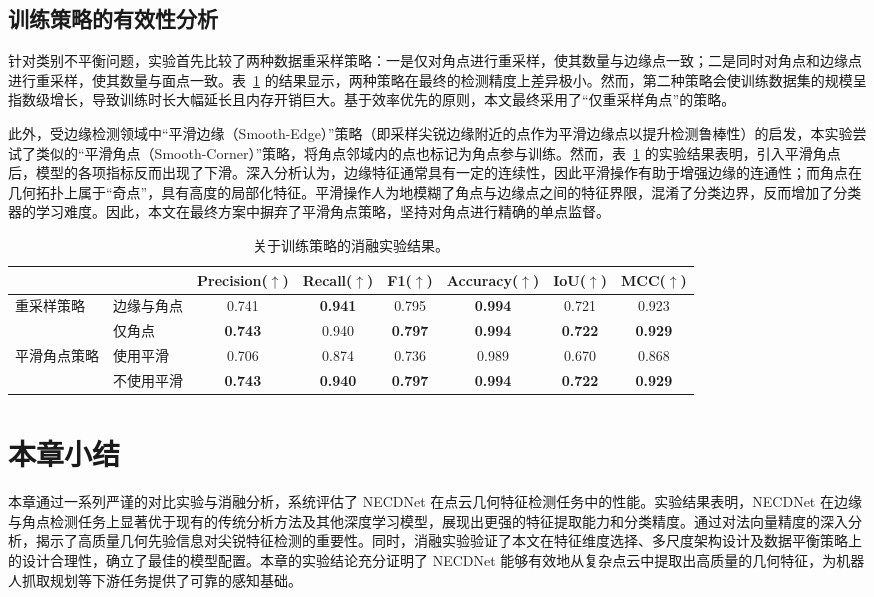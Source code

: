 \subsection{训练策略的有效性分析}

针对类别不平衡问题，实验首先比较了两种数据重采样策略：一是仅对角点进行重采样，使其数量与边缘点一致；二是同时对角点和边缘点进行重采样，使其数量与面点一致。表~\ref{tab:additional_ablation_study} 的结果显示，两种策略在最终的检测精度上差异极小。然而，第二种策略会使训练数据集的规模呈指数级增长，导致训练时长大幅延长且内存开销巨大。基于效率优先的原则，本文最终采用了“仅重采样角点”的策略。

此外，受边缘检测领域中“平滑边缘（Smooth-Edge）”策略（即采样尖锐边缘附近的点作为平滑边缘点以提升检测鲁棒性）的启发，本实验尝试了类似的“平滑角点（Smooth-Corner）”策略，将角点邻域内的点也标记为角点参与训练。然而，表~\ref{tab:additional_ablation_study} 的实验结果表明，引入平滑角点后，模型的各项指标反而出现了下滑。深入分析认为，边缘特征通常具有一定的连续性，因此平滑操作有助于增强边缘的连通性；而角点在几何拓扑上属于“奇点”，具有高度的局部化特征。平滑操作人为地模糊了角点与边缘点之间的特征界限，混淆了分类边界，反而增加了分类器的学习难度。因此，本文在最终方案中摒弃了平滑角点策略，坚持对角点进行精确的单点监督。

\begin{table}[ht]
    \centering
    \small
    \setlength{\tabcolsep}{4.5pt}
    \caption{关于训练策略的消融实验结果。}
    \label{tab:additional_ablation_study}
    \begin{tabular}{llcccccc}
            \toprule
            & & Precision($\uparrow$) & Recall($\uparrow$) & F1($\uparrow$)& Accuracy($\uparrow$)& IoU($\uparrow$)& MCC($\uparrow$)\\
            \midrule
   
            \multirow{2}{*}{重采样策略}
            & 边缘与角点 & 0.741& \textbf{0.941}& 0.795& \textbf{0.994}& 0.721& 0.923\\
            & 仅角点 & \textbf{0.743}& 0.940& \textbf{0.797}& \textbf{0.994}& \textbf{0.722}& \textbf{0.929}\\
           
            \midrule
           
            \multirow{2}{*}{平滑角点策略}
            & 使用平滑 & 0.706& 0.874& 0.736& 0.989& 0.670& 0.868\\
            & 不使用平滑 & \textbf{0.743}& \textbf{0.940}& \textbf{0.797}& \textbf{0.994}& \textbf{0.722}& \textbf{0.929}\\
           
            \bottomrule
        \end{tabular}
\end{table}

\section{本章小结}

本章通过一系列严谨的对比实验与消融分析，系统评估了 NECDNet 在点云几何特征检测任务中的性能。实验结果表明，NECDNet 在边缘与角点检测任务上显著优于现有的传统分析方法及其他深度学习模型，展现出更强的特征提取能力和分类精度。通过对法向量精度的深入分析，揭示了高质量几何先验信息对尖锐特征检测的重要性。同时，消融实验验证了本文在特征维度选择、多尺度架构设计及数据平衡策略上的设计合理性，确立了最佳的模型配置。本章的实验结论充分证明了 NECDNet 能够有效地从复杂点云中提取出高质量的几何特征，为机器人抓取规划等下游任务提供了可靠的感知基础。